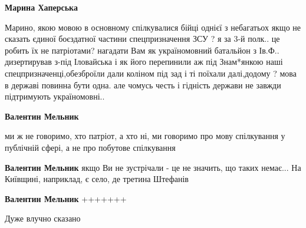 \begin{itemize}
\begin{itemize}
\textbf{Марина Хаперська} 

Марино, якою мовою в основному спілкувалися бійці однієї з небагатьох якщо не
сказать єдиної боєздатної частини спецпризначення ЗСУ ? я за 3-й полк.. це
робить їх не патріотами? нагадати Вам як україномовний батальйон з Ів.Ф..
дизертирував з-під Іловайська і як його перепинили аж під Знам*янкою наші
спецпризначенці,обезброїли дали коліном під зад і ті поїхали далі,додому ? мова
в державі повинна бути одна. але чомусь честь і гідність держави не завжди
підтримують україномовні..


 
\textbf{Валентин Мельник} 

ми ж не говоримо, хто патріот, а хто ні, ми говоримо про мову спілкування у
публічній сфері, а не про побутове спілкування

 
\textbf{Валентин Мельник} якщо Ви не зустрічали - це не значить, що таких немає... На Київщині, наприклад, є село, де третина Штефанів

 
\textbf{Валентин Мельник} +++++++

\end{itemize}

 
Дуже влучно сказано

 

\end{itemize}

